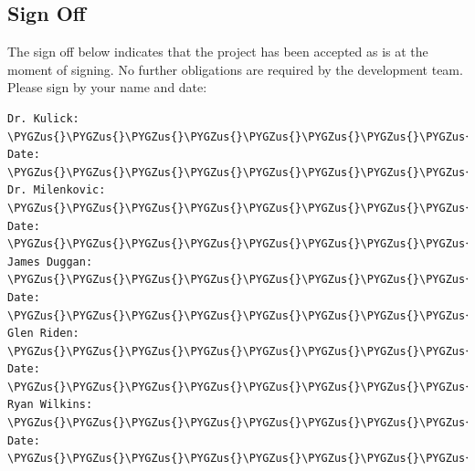 \documentclass[letterpaper,10pt,english]{sphinxmanual}
\def\PYGZus{\char`\_}
\begin{document}
\subsection{Sign Off}
\label{STD/software_test_description:sign-off}
The sign off below indicates that the project has been accepted as is at the moment of signing. No further obligations
are required by the development team. Please sign by your name and date:

\begin{Verbatim}[commandchars=\\\{\}]
Dr. Kulick:       \PYGZus{}\PYGZus{}\PYGZus{}\PYGZus{}\PYGZus{}\PYGZus{}\PYGZus{}\PYGZus{}\PYGZus{}\PYGZus{}\PYGZus{}\PYGZus{}\PYGZus{}\PYGZus{}\PYGZus{}\PYGZus{}\PYGZus{}\PYGZus{}\PYGZus{}\PYGZus{}\PYGZus{}\PYGZus{}\PYGZus{}\PYGZus{}\PYGZus{}\PYGZus{}\PYGZus{}\PYGZus{}\PYGZus{}\PYGZus{}\PYGZus{}\PYGZus{}\PYGZus{}\PYGZus{}\PYGZus{}\PYGZus{}\PYGZus{}\PYGZus{}\PYGZus{}\PYGZus{}\PYGZus{} Date: \PYGZus{}\PYGZus{}\PYGZus{}\PYGZus{}\PYGZus{}\PYGZus{}\PYGZus{}\PYGZus{}\PYGZus{}\PYGZus{}\PYGZus{}\PYGZus{}
Dr. Milenkovic:   \PYGZus{}\PYGZus{}\PYGZus{}\PYGZus{}\PYGZus{}\PYGZus{}\PYGZus{}\PYGZus{}\PYGZus{}\PYGZus{}\PYGZus{}\PYGZus{}\PYGZus{}\PYGZus{}\PYGZus{}\PYGZus{}\PYGZus{}\PYGZus{}\PYGZus{}\PYGZus{}\PYGZus{}\PYGZus{}\PYGZus{}\PYGZus{}\PYGZus{}\PYGZus{}\PYGZus{}\PYGZus{}\PYGZus{}\PYGZus{}\PYGZus{}\PYGZus{}\PYGZus{}\PYGZus{}\PYGZus{}\PYGZus{}\PYGZus{}\PYGZus{}\PYGZus{}\PYGZus{}\PYGZus{} Date: \PYGZus{}\PYGZus{}\PYGZus{}\PYGZus{}\PYGZus{}\PYGZus{}\PYGZus{}\PYGZus{}\PYGZus{}\PYGZus{}\PYGZus{}\PYGZus{}
James Duggan:     \PYGZus{}\PYGZus{}\PYGZus{}\PYGZus{}\PYGZus{}\PYGZus{}\PYGZus{}\PYGZus{}\PYGZus{}\PYGZus{}\PYGZus{}\PYGZus{}\PYGZus{}\PYGZus{}\PYGZus{}\PYGZus{}\PYGZus{}\PYGZus{}\PYGZus{}\PYGZus{}\PYGZus{}\PYGZus{}\PYGZus{}\PYGZus{}\PYGZus{}\PYGZus{}\PYGZus{}\PYGZus{}\PYGZus{}\PYGZus{}\PYGZus{}\PYGZus{}\PYGZus{}\PYGZus{}\PYGZus{}\PYGZus{}\PYGZus{}\PYGZus{}\PYGZus{}\PYGZus{}\PYGZus{} Date: \PYGZus{}\PYGZus{}\PYGZus{}\PYGZus{}\PYGZus{}\PYGZus{}\PYGZus{}\PYGZus{}\PYGZus{}\PYGZus{}\PYGZus{}\PYGZus{}
Glen Riden:       \PYGZus{}\PYGZus{}\PYGZus{}\PYGZus{}\PYGZus{}\PYGZus{}\PYGZus{}\PYGZus{}\PYGZus{}\PYGZus{}\PYGZus{}\PYGZus{}\PYGZus{}\PYGZus{}\PYGZus{}\PYGZus{}\PYGZus{}\PYGZus{}\PYGZus{}\PYGZus{}\PYGZus{}\PYGZus{}\PYGZus{}\PYGZus{}\PYGZus{}\PYGZus{}\PYGZus{}\PYGZus{}\PYGZus{}\PYGZus{}\PYGZus{}\PYGZus{}\PYGZus{}\PYGZus{}\PYGZus{}\PYGZus{}\PYGZus{}\PYGZus{}\PYGZus{}\PYGZus{}\PYGZus{} Date: \PYGZus{}\PYGZus{}\PYGZus{}\PYGZus{}\PYGZus{}\PYGZus{}\PYGZus{}\PYGZus{}\PYGZus{}\PYGZus{}\PYGZus{}\PYGZus{}
Ryan Wilkins:     \PYGZus{}\PYGZus{}\PYGZus{}\PYGZus{}\PYGZus{}\PYGZus{}\PYGZus{}\PYGZus{}\PYGZus{}\PYGZus{}\PYGZus{}\PYGZus{}\PYGZus{}\PYGZus{}\PYGZus{}\PYGZus{}\PYGZus{}\PYGZus{}\PYGZus{}\PYGZus{}\PYGZus{}\PYGZus{}\PYGZus{}\PYGZus{}\PYGZus{}\PYGZus{}\PYGZus{}\PYGZus{}\PYGZus{}\PYGZus{}\PYGZus{}\PYGZus{}\PYGZus{}\PYGZus{}\PYGZus{}\PYGZus{}\PYGZus{}\PYGZus{}\PYGZus{}\PYGZus{}\PYGZus{} Date: \PYGZus{}\PYGZus{}\PYGZus{}\PYGZus{}\PYGZus{}\PYGZus{}\PYGZus{}\PYGZus{}\PYGZus{}\PYGZus{}\PYGZus{}\PYGZus{}
\end{Verbatim}
\end{document}
